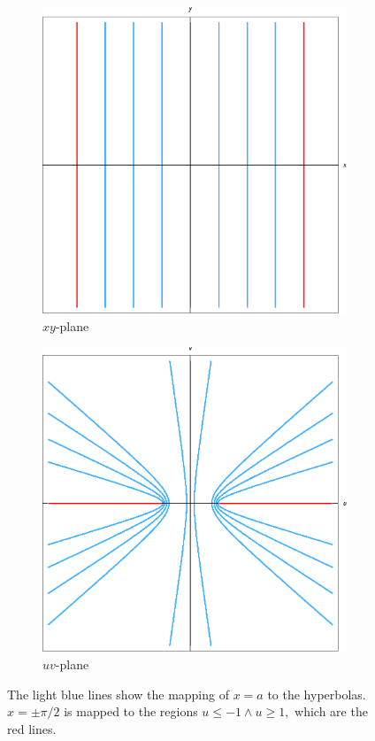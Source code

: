 \documentclass[12pt]{book}
\begin{document}
\begin{figure}[H]
    \centering
    \begin{subfigure}{0.45\textwidth}
        \centering
        \includegraphics[width = \textwidth]{./figs/chapter_2/sin_map_z.eps}
        \caption{$xy$-plane}
    \end{subfigure}
    \qquad
    \begin{subfigure}{0.45\textwidth}
        \centering
        \includegraphics[width = \textwidth]{./figs/chapter_2/sin_map_w.eps}
        \caption{$uv$-plane}
    \end{subfigure}
    \caption{The light blue lines show the mapping of $x = a$ to the hyperbolas. $x = \pm \pi / 2$ is mapped to the regions $u \leq -1 \land u \geq 1,$ which are the red lines.}
\end{figure}

\cite{shanahan2003}
\printbibliography
\end{document}
